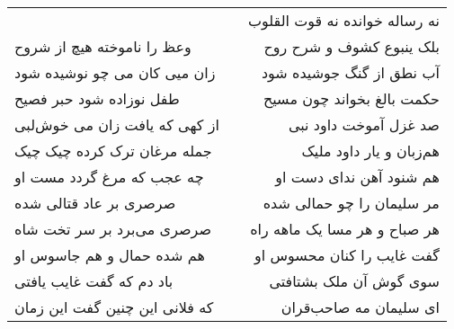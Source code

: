\begin{center}
\begin{longtable}{l p{0.5cm} r}
&&
نه رساله خوانده نه قوت القلوب
\\
وعظ را ناموخته هیچ از شروح
&&
بلک ینبوع کشوف و شرح روح
\\
زان میی کان می چو نوشیده شود
&&
آب نطق از گنگ جوشیده شود
\\
طفل نوزاده شود حبر فصیح
&&
حکمت بالغ بخواند چون مسیح
\\
از کهی که یافت زان می خوش‌لبی
&&
صد غزل آموخت داود نبی
\\
جمله مرغان ترک کرده چیک چیک
&&
هم‌زبان و یار داود ملیک
\\
چه عجب که مرغ گردد مست او
&&
هم شنود آهن ندای دست او
\\
صرصری بر عاد قتالی شده
&&
مر سلیمان را چو حمالی شده
\\
صرصری می‌برد بر سر تخت شاه
&&
هر صباح و هر مسا یک ماهه راه
\\
هم شده حمال و هم جاسوس او
&&
گفت غایب را کنان محسوس او
\\
باد دم که گفت غایب یافتی
&&
سوی گوش آن ملک بشتافتی
\\
که فلانی این چنین گفت این زمان
&&
ای سلیمان مه صاحب‌قران
\\
\end{longtable}
\end{center}
